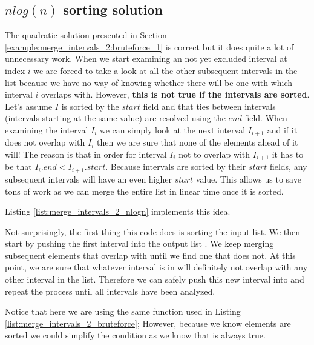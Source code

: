 \subsection{$nlog(n)$ sorting solution}
\label{example:merge_intervals_2:sorting_1}
The quadratic solution presented in Section \ref{example:merge_intervals_2:bruteforce_1} is correct but it does quite a lot of unnecessary work.
When we start examining an not yet excluded interval at index $i$ we are forced to take a look at all the other subsequent intervals in the list because we have no way of knowing whether there will be one with which interval $i$ overlaps with.
However, \textbf{this is not true if the intervals are sorted}. 
Let's assume $I$ is sorted by the $start$ field and that ties between intervals (intervals starting at the same value) are resolved using the $end$ field.
When examining the interval $I_i$ we can simply look at the next interval $I_{i+1}$ and if it does not overlap with $I_i$ then we are sure that none of the elements ahead of it will!
The reason is that in order for interval $I_i$ not to overlap with $I_{i+1}$ it has to be that $I_i.end < I_{i+1}.start$.
Because intervals are sorted by their $start$ fields, any subsequent intervals will have an even higher $start$ value. 
This allows us to save tons of work as we can merge the entire list in linear time once it is sorted. 

Listing \ref{list:merge_intervals_2_nlogn} implements this idea.



Not surprisingly, the first thing this code does is sorting the input list.
We then start by pushing the first interval into the output list .
We keep merging subsequent elements that overlap with  until we find one that does not.
At this point, we are sure that whatever interval is in  will definitely not overlap with any other interval in the list.
Therefore we can safely push this new interval into  and repeat the process until all intervals have been analyzed.

Notice that here we are using the same  function used in Listing \ref{list:merge_intervals_2_bruteforce};
However, because we know elements are sorted we could simplify the condition  as we know that  is always true.

